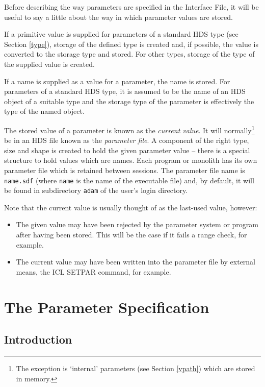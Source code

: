 \documentclass[twoside,11pt]{article}
\newcommand{\xlabel}[1]{}
\renewcommand{\_}{\texttt{\symbol{95}}}
\begin{document}
Before describing the way parameters are specified in the Interface File, it
will be useful to say a little about the way in which parameter values are
stored.

If a primitive value is supplied for parameters of a standard HDS type
(see Section \ref{type}),
storage of the defined type is created and, if possible, the value is
converted to the storage type and stored.
For other types, storage of the type of the supplied value is created.

If a name is supplied as a value for a parameter, the name is stored.
For parameters of a standard HDS type, it is assumed to be the name of an HDS
object of a suitable type and the storage type of the parameter is effectively
the type of the named object.

The stored value of a parameter is known as the {\em current value}. It will
normally\footnote{The exception is `internal' parameters (see Section
\ref{vpath}) which are stored in memory.} be in an HDS file known as the
{\em parameter file}.
A component of the right type, size and shape is created to hold the given
parameter value -- there is a special structure to hold values which are names.
Each program or monolith has its own parameter file which is retained between
sessions. The parameter file name is \texttt{name.sdf} (where \texttt{name} is the
name of the executable file) and, by default, it will be found in subdirectory
\texttt{adam} of the user's login directory.

Note that the current value is usually thought of as the last-used value,
however:
\begin{itemize}
\item The given value may have been rejected by the parameter system or program
after having been stored. This will be the case if it fails a range check, for
example.
\item The current value may have been written into the parameter file by
external means, the ICL SETPAR command, for example.
\end{itemize}

\section{The Parameter Specification\xlabel{the_parameter_specification}}

\subsection{Introduction\xlabel{introduction2}}
\end{document}
